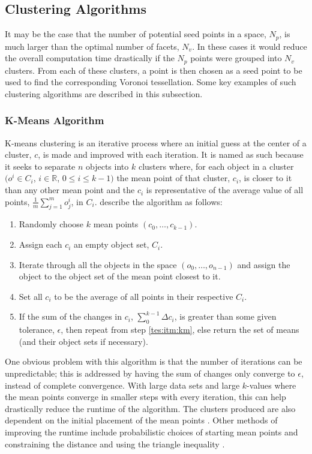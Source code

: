 \subsection{Clustering Algorithms} \label{tes:sec:clu}
It may be the case that the number of potential seed points in a space, $N_p$, is much larger than the optimal number of facets, $N_v$. In these cases it would reduce the overall computation time drastically if the $N_p$ points were grouped into $N_v$ clusters. From each of these clusters, a point is then chosen as a seed point to be used to find the corresponding Voronoi tessellation. Some key examples of such clustering algorithms are described in this subsection.
%
\subsubsection{K-Means Algorithm}\label{tes:ssec:kma}
K-means clustering is an iterative process where an initial guess at the center of a cluster, $c$, is made and improved with each iteration. It is named as such because it seeks to separate $n$ objects into $k$ clusters where, for each object in a cluster $( o^i \in C_i$, $i \in \mathbb{R}$, $0\leq i \leq k-1)$ the mean point of that cluster, $c_i$, is closer to it than any other mean point and the $c_i$ is representative of the average value of all points, $\frac{1}{m}\sum^m_{j=1}o^i_j$, in $C_i$. \citet{way2012advances} describe the algorithm as follows:
\begin{enumerate}
  \item	Randomly choose $k$ mean points $(c_0,\dots,c_{k-1})$.
  \item\label{tes:itm:km} Assign each $c_i$ an empty object set, $C_i$.
  \item Iterate through all the objects in the space $(o_0,\dots,o_{n-1})$ and assign the object to the object set of the mean point closest to it.
  \item Set all $c_i$ to be the average of all points in their respective $C_i$.
  \item If the sum of the changes in $c_i$, $\sum_0^{k-1} \Delta c_i$, is greater than some given tolerance, $\epsilon$, then repeat from step \ref{tes:itm:km}, else return the set of means (and their object sets if 	      necessary).
\end{enumerate}
One obvious problem with this algorithm is that the number of iterations can be unpredictable; this is addressed by having the sum of changes only converge to $\epsilon$, instead of complete convergence. With large data sets and large $k$-values where the mean points converge in smaller steps with every iteration, this can help drastically reduce the runtime of the algorithm. The clusters produced are also dependent on the initial placement of the mean points \citep{way2012advances}. Other methods of improving the runtime include probabilistic choices of starting mean points \citep{arthur2007k} and constraining the distance and using the triangle inequality \citep{hamerly2010making}.
%
